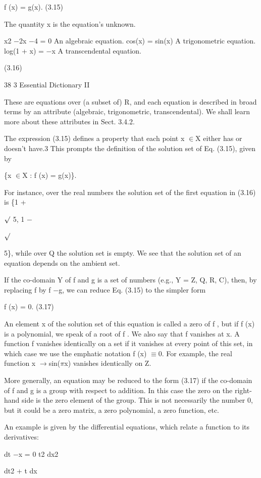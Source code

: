 \documentclass[11pt]{article}
\theoremstyle{plain}
\theoremstyle{definition}
\begin{document}
f (x) = g(x). (3.15)

The quantity x is the equation's unknown.

x2 $-$2x $-$4 = 0 An algebraic equation. cos(x) = sin(x) A trigonometric equation. log(1 + x) = $-$x A transcendental equation.

(3.16)

38 3 Essential Dictionary II

These are equations over (a subset of) R, and each equation is described in broad terms by an attribute (algebraic, trigonometric, transcendental). We shall learn more about these attributes in Sect. 3.4.2.

The expression (3.15) defines a property that each point x $\in$X either has or doesn't have.3 This prompts the definition of the solution set of Eq. (3.15), given by

\{x $\in$X : f (x) = g(x)\}.

For instance, over the real numbers the solution set of the first equation in (3.16) is \{1 +

$\surd$ 5, 1 $-$

$\surd$

5\}, while over Q the solution set is empty. We see that the solution set of an equation depends on the ambient set.

If the co-domain Y of f and g is a set of numbers (e.g., Y = Z, Q, R, C), then, by replacing f by f $-$g, we can reduce Eq. (3.15) to the simpler form

f (x) = 0. (3.17)

An element x of the solution set of this equation is called a zero of f , but if f (x) is a polynomial, we speak of a root of f . We also say that f vanishes at x. A function f vanishes identically on a set if it vanishes at every point of this set, in which case we use the emphatic notation f (x) $\equiv$0. For example, the real function x $\to$sin($\pi$x) vanishes identically on Z.

More generally, an equation may be reduced to the form (3.17) if the co-domain of f and g is a group with respect to addition. In this case the zero on the right-hand side is the zero element of the group. This is not necessarily the number 0, but it could be a zero matrix, a zero polynomial, a zero function, etc.

An example is given by the differential equations, which relate a function to its derivatives:

dt $-$x = 0 t2 dx2

dt2 + t dx
\end{document}
